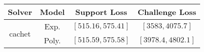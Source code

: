 \begin{tabular}{cc|c|c} 
\hline 
 Solver & Model & Support Loss  & Challenge Loss \tabularnewline\hline 
\hline 
\multirow{2}{*}{cachet} & Exp. & $\left[515.16,575.41\right]$ & $\left[3583,4075.7\right]$ \tabularnewline 
 & Poly. & $\left[515.59,575.58\right]$ & $\left[3978.4,4802.1\right]$ \tabularnewline 
\hline 
\end{tabular} 


